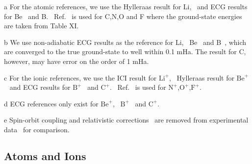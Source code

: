 \documentclass[aip,jcp,numerical,reprint]{revtex4-1}
\begin{document}
\begin{table}[t!]
\begin{threeparttable}
\begin{tablenotes}
\item[a] For the atomic references, we use the Hylleraas result for Li,~\cite{Wang_Li} and ECG results for Be~\cite{Stanke_Be} and B.~\cite{Bubin_B} Ref.~\cite{Davidson_Atoms} is used for C,N,O and F where the ground-state energies are taken from Table XI.
\item[b] We use non-adiabatic ECG results as the reference for Li,~\cite{Stanke_Li} Be~\cite{Bubin_BeH_noBO} and B~\cite{Bubin_B}, which are converged to the true ground-state to well within 0.1 mHa. The result for C,~\cite{Bubin_C} however, may have error on the order of 1 mHa.
\item[c] For the ionic references, we use the ICI result for $\text{Li}^+$,~\cite{Nakashima_Li+} Hylleraas result for $\text{Be}^+$~\cite{Puchalski_Be+} and ECG results for $\text{B}^+$~\cite{Bubin_B+} and $\text{C}^+$.~\cite{Bubin_C+,mitroy2013} Ref.~\cite{Davidson_Atoms} is used for $\text{N}^+$,$\text{O}^+$,$\text{F}^+$.
\item[d] ECG references only exist for $\text{Be}^+$,~\cite{Bubin_BeH_noBO} $\text{B}^+$~\cite{Bubin_B+} and $\text{C}^+$.~\cite{Bubin_C+}
\item[e] Spin-orbit coupling and relativistic corrections~\cite{Klopper_IP} are removed from experimental data~\cite{NIST_Atoms} for comparison.
\end{tablenotes}

\end{threeparttable}
\end{table}

\subsection{Atoms and Ions}
\end{document}
